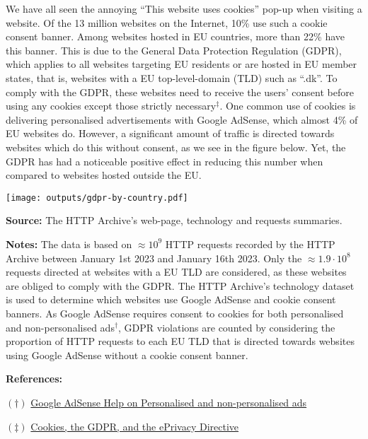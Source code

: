 \documentclass[border=0mm]{article}
\begin{document}
\begin{minipage}{0.5\textwidth}
\small
\vspace*{0.2cm}
We have all seen the annoying ``This website uses cookies'' pop-up when visiting a website.
Of the 13 million websites on the Internet, 10\% use such a cookie consent banner. Among
websites hosted in EU countries, more than 22\% have this banner.
This is due to the General Data Protection Regulation (GDPR), which
applies to all websites targeting EU residents
or are hosted in EU member states, that is, websites with a EU top-level-domain (TLD)
such as ``.dk''. To comply with the GDPR, these websites need to receive the users' consent
before using any cookies except those strictly necessary$^\ddagger$. One common use of cookies is delivering
personalised advertisements with Google AdSense, which almost 4\% of EU websites do.
However, a significant amount of traffic is directed towards websites which do this without
consent, as we see in the figure below. Yet, the GDPR has had a noticeable positive effect in reducing this number when compared
to websites hosted outside the EU.

\vspace*{.2cm}

\texttt{[image: outputs/gdpr-by-country.pdf]}

{\small\linespread{.1}\selectfont\fontsize{8pt}{.1cm}\selectfont
\textbf{Source:} The HTTP Archive's web-page, technology and requests summaries.

\textbf{Notes:} The data is based on $\approx 10^9$ HTTP requests recorded by the HTTP Archive
    between January 1st 2023 and January 16th 2023. Only the $\approx 1.9 \cdot 10^8$ requests
    directed at websites with a EU TLD are considered, as these websites are
    obliged to comply with the GDPR.
    The HTTP Archive's technology dataset is used
    to determine which websites use Google AdSense and cookie consent banners. As Google AdSense
    requires consent to cookies for both personalised and non-personalised ads$^{\dagger}$,
    GDPR violations are counted by considering the proportion of HTTP requests to each EU TLD that
    is directed towards websites using Google AdSense without a cookie consent banner.
\par}


\begin{references}[width=1\textwidth,arc=10pt,auto outer arc]
\textbf{References:}

$(\dagger)$ \href{https://support.google.com/adsense/answer/9007336}{\color{dark} Google AdSense Help on Personalised and non-personalised ads}

$(\ddagger)$ \href{https://gdpr.eu/cookies/}{\color{dark} Cookies, the GDPR, and the ePrivacy Directive}
\end{references}



\end{minipage}%
\end{document}
